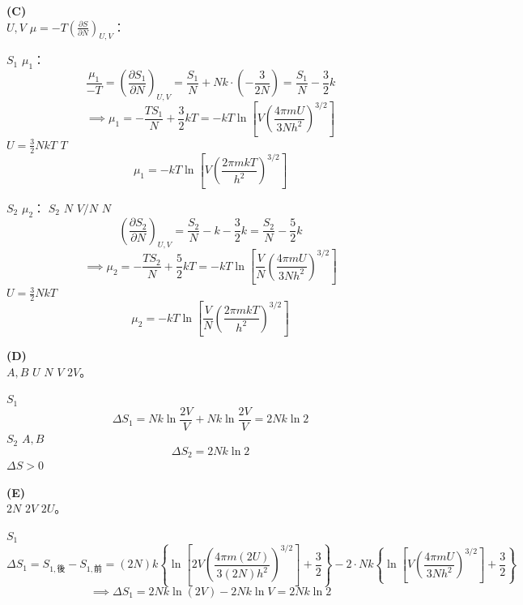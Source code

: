 \vspace{1em}
\textbf{(C) } \\
 $U, V$  $\mu = -T \left(\frac{\partial S}{\partial N}\right)_{U,V}$：

 $S_1$  $\mu_1$：
\[ \frac{\mu_1}{-T} = \left(\frac{\partial S_1}{\partial N}\right)_{U,V} = \frac{S_1}{N} + Nk \cdot \left(-\frac{3}{2N}\right) = \frac{S_1}{N} - \frac{3}{2}k \]
\[ \implies \mu_1 = -\frac{T S_1}{N} + \frac{3}{2}kT = -kT \ln\left[ V \left(\frac{4\pi mU}{3Nh^2}\right)^{3/2} \right] \]
 $U = \frac{3}{2}NkT$  $T$
\[ \mu_1 = -kT \ln\left[ V \left(\frac{2\pi mkT}{h^2}\right)^{3/2} \right] \]

 $S_2$  $\mu_2$：
 $S_2$  $N$  $V/N$  $N$
\[ \left(\frac{\partial S_2}{\partial N}\right)_{U,V} = \frac{S_2}{N} - k - \frac{3}{2}k = \frac{S_2}{N} - \frac{5}{2}k \]
\[ \implies \mu_2 = -\frac{T S_2}{N} + \frac{5}{2}kT = -kT \ln\left[ \frac{V}{N} \left(\frac{4\pi mU}{3Nh^2}\right)^{3/2} \right] \]
 $U = \frac{3}{2}NkT$ 
\[ \mu_2 = -kT \ln\left[ \frac{V}{N} \left(\frac{2\pi mkT}{h^2}\right)^{3/2} \right] \]

\vspace{1em}
\textbf{(D) } \\
 $A, B$  $U$  $N$  $V$  $2V$。

 $S_1$ 
\[ \Delta S_{1} = Nk \ln \frac{2V}{V} + Nk \ln \frac{2V}{V} = 2Nk \ln 2 \]
 $S_2$  $A, B$ 
\[ \Delta S_{2} = 2Nk \ln 2 \]
 $\Delta S > 0$ 

\vspace{1em}
\textbf{(E) } \\
 $2N$ $2V$ $2U$。

 $S_1$ 
\[ \Delta S_{1} = S_{1,\text{後}} - S_{1,\text{前}} = (2N)k \left\{ \ln \left[ 2V \left(\frac{4\pi m(2U)}{3(2N)h^{2}}\right)^{3/2} \right] + \frac{3}{2} \right\} - 2 \cdot Nk \left\{ \ln \left[ V \left(\frac{4\pi mU}{3Nh^{2}}\right)^{3/2} \right] + \frac{3}{2} \right\} \]
\[ \implies \Delta S_{1} = 2Nk \ln (2V) - 2Nk \ln V = 2Nk \ln 2 \]

